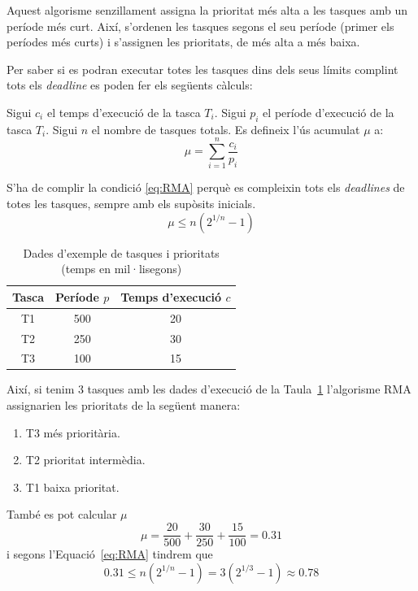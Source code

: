 Aquest algorisme senzillament assigna la prioritat més alta a les tasques amb un període més curt. Així, s'ordenen les tasques segons el seu període (primer els períodes més curts) i s'assignen les prioritats, de més alta a més baixa.

Per saber si es podran executar totes les tasques dins dels seus límits complint tots els {\em deadline} es poden fer els següents càlculs:

Sigui $c_i$ el temps d'execució de la tasca $T_i$. Sigui $p_i$ el període d'execució de la tasca $T_i$. Sigui $n$ el nombre de tasques totals.
Es defineix l'ús acumulat $\mu$ a:
\begin{equation*}
 \mu = \sum^{n}_{i=1}\frac{c_i}{p_i}
\end{equation*}

S'ha de complir la condició \ref{eq:RMA} perquè es compleixin tots els {\em deadlines} de totes les tasques, sempre amb els supòsits inicials.
\begin{equation}
\label{eq:RMA}
 \mu \leq n (2^{1/n}-1)
\end{equation}

\begin{table}[b]
\caption{Dades d'exemple de tasques i prioritats (temps en mil·lisegons)}
\label{tb:RMA_example}
\centering
\begin{tabular}{|c|c|c|}
\hline
{\bf Tasca} & {\bf Període $p$} & {\bf Temps d'execució $c$}\\
\hline
T1 & 500 & 20\\
\hline
T2 & 250 & 30\\
\hline
T3 & 100 & 15\\
\hline
\end{tabular}
\end{table}

Així, si tenim 3 tasques amb les dades d'execució de la Taula~\ref{tb:RMA_example} l'algorisme RMA assignarien les prioritats de la següent manera:

\begin{enumerate}
 \item T3 més prioritària.
 \item T2 prioritat intermèdia.
 \item T1 baixa prioritat.
\end{enumerate}

També es pot calcular $\mu$
\begin{equation*}
 \mu = \frac{20}{500} + \frac{30}{250} + \frac{15}{100} = 0.31
\end{equation*}
i segons l'Equació~\ref{eq:RMA} tindrem que
\begin{equation*}
 0.31 \leq n (2^{1/n}-1) = 3(2^{1/3}-1) \approx 0.78
\end{equation*}


